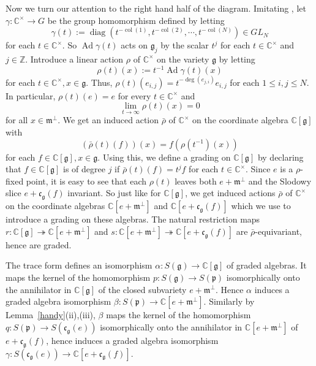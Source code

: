 \documentclass[twoside,12pt,reqno]{amsart}
\def\Ad{\operatorname{Ad}}
\def\col{\operatorname{col}}
\def\C{{\mathbb C}}
\def\Z{{\mathbb Z}}
\def\diag{{\operatorname{diag}}}
\begin{document}
Now we turn our attention to the right hand half of the diagram.
Imitating \cite[$\S$2.1]{GG}, 
let $\gamma:\C^\times \rightarrow G$ be the group homomorphism
defined by letting
\begin{equation}
\gamma(t):=
\diag(t^{-\col(1)}, t^{-\col(2)}, \cdots, t^{-\col(N)}) \in GL_N
\end{equation}
for each $t \in \C^\times$.
So $\Ad \gamma(t)$ acts on $\mathfrak{g}_j$ by the scalar $t^{j}$
for each $t \in \C^\times$ and $j \in \Z$.
Introduce a linear action $\rho$
of $\C^\times$ on the variety $\mathfrak{g}$
by letting 
\begin{equation}\label{rho1}
\rho(t)(x) := t^{-1} \Ad \gamma(t)(x)
\end{equation}
for each $t \in \C^\times, x \in \mathfrak{g}$.
Thus, $\rho(t) (e_{i,j}) = t^{-\deg(e_{j,i})} e_{i,j}$
for each $1 \leq i,j \leq N$. In particular,
$\rho(t)(e) = e$ for every $t \in \C^\times$ and
\begin{equation}\label{lim1}
\lim_{t \rightarrow \infty} \rho(t)(x) = 0
\end{equation}
for all $x \in \mathfrak{m}^{\perp}$.
We get an induced action $\bar\rho$
of $\C^\times$ on the coordinate
algebra $\C[\mathfrak{g}]$ with
\begin{equation}
(\bar\rho(t) (f))(x) = f(\rho(t^{-1}) (x))\end{equation}
for each $f \in \C[\mathfrak{g}], x \in \mathfrak{g}$.
Using this, we define a grading on $\C[\mathfrak{g}]$
by declaring that $f \in \C[\mathfrak{g}]$ is of degree $j$
if $\bar\rho(t) (f) = t^{j} f$ for each $t \in \C^\times$.
Since $e$ is a $\rho$-fixed point,
it is easy to see that each $\rho(t)$ leaves 
both $e + \mathfrak{m}^\perp$ and
the Slodowy slice $e + \mathfrak{c}_{\mathfrak{g}}(f)$
invariant. So just like for $\C[\mathfrak{g}]$,
we get induced actions $\bar\rho$ of $\C^\times$
on the coordinate algebras $\C[e+\mathfrak{m}^\perp]$
and $\C[e+\mathfrak{c}_{\mathfrak{g}}(f)]$
which we use to introduce a grading on these algebras.
The natural restriction maps
$r:\C[\mathfrak{g}] \twoheadrightarrow
\C[e+\mathfrak{m}^\perp]$ and
$s:\C[e+\mathfrak{m}^\perp] 
\twoheadrightarrow \C[e+\mathfrak{c}_{\mathfrak{g}}(f)]$
are $\bar\rho$-equivariant, hence are graded.

The trace form defines an isomorphism
$\alpha:S(\mathfrak{g}) \rightarrow \C[\mathfrak{g}]$
of graded algebras. It maps the
kernel of the homomorphism $p:S(\mathfrak{g})
\rightarrow S(\mathfrak{p})$ isomorphically onto the annihilator
in $\C[\mathfrak{g}]$ of the closed subvariety $e+\mathfrak{m}^\perp$.
Hence $\alpha$ 
induces a graded algebra
isomorphism $\beta:S(\mathfrak{p}) \rightarrow 
\C[e+\mathfrak{m}^\perp]$.
Similarly by Lemma~\ref{handy}(ii),(iii),
$\beta$ maps the kernel of the homomorphism
$q:S(\mathfrak{p}) \rightarrow S(\mathfrak{c}_{\mathfrak{g}}(e))$
isomorphically onto the annihilator in $\C[e+\mathfrak{m}^\perp]$
of $e+\mathfrak{c}_{\mathfrak{g}}(f)$, hence induces
a graded algebra isomorphism $\gamma:S(\mathfrak{c}_{\mathfrak{g}}(e))
\rightarrow \C[e+\mathfrak{c}_{\mathfrak{g}}(f)]$.
\end{document}
